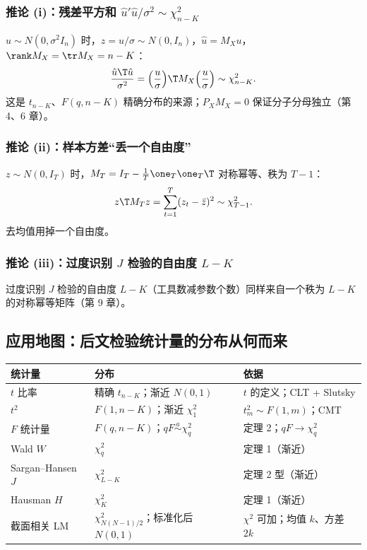 \subsubsection{推论 (i)：残差平方和 \texorpdfstring{$\hat u'\hat u/\sigma^2\sim\chi^2_{n-K}$}{u'u/sigma\^2 ~ chi2(n-K)}}

$u\sim N(0,\sigma^2I_n)$ 时，$z=u/\sigma\sim N(0,I_n)$，$\hat u=M_Xu$，$\rank M_X=\tr M_X=n-K$：
\[
\frac{\hat u\T\hat u}{\sigma^2}=\Big(\frac u\sigma\Big)\T M_X\Big(\frac u\sigma\Big)\sim\chi^2_{n-K}.
\]
这是 $t_{n-K}$、$F(q,n-K)$ 精确分布的来源；$P_XM_X=0$ 保证分子分母独立（第 4、6 章）。

\subsubsection{推论 (ii)：样本方差“丢一个自由度”}

$z\sim N(0,I_T)$ 时，$M_T=I_T-\frac1T\one_T\one_T\T$ 对称幂等、秩为 $T-1$：
\[
z\T M_Tz=\sum_{t=1}^T(z_t-\bar z)^2\sim\chi^2_{T-1}.
\]
去均值用掉一个自由度。

\subsubsection{推论 (iii)：过度识别 \texorpdfstring{$J$}{J} 检验的自由度 \texorpdfstring{$L-K$}{L-K}}

过度识别 $J$ 检验的自由度 $L-K$（工具数减参数个数）同样来自一个秩为 $L-K$ 的对称幂等矩阵（第 9 章）。

\subsection{应用地图：后文检验统计量的分布从何而来}

\begin{center}\begin{minipage}{\linewidth}\centering
\small
\begin{tabularx}{\linewidth}{lLL}
\toprule
统计量 & 分布 & 依据\\
\midrule
$t$ 比率 & 精确 $t_{n-K}$；渐近 $N(0,1)$ & $t$ 的定义；CLT + Slutsky\\
$t^2$ & $F(1,n-K)$；渐近 $\chi^2_1$ & $t_m^2\sim F(1,m)$；CMT\\
$F$ 统计量 & $F(q,n-K)$；$qF\overset{a}{\sim}\chi^2_q$ & 定理 2；$qF\to\chi^2_q$\\
Wald $W$ & $\chi^2_q$ & 定理 1（渐近）\\
Sargan--Hansen $J$ & $\chi^2_{L-K}$ & 定理 2 型（渐近）\\
Hausman $H$ & $\chi^2_K$ & 定理 1（渐近）\\
截面相关 LM & $\chi^2_{N(N-1)/2}$；标准化后 $N(0,1)$ & $\chi^2$ 可加；均值 $k$、方差 $2k$\\
\bottomrule
\end{tabularx}
\end{minipage}\end{center}


